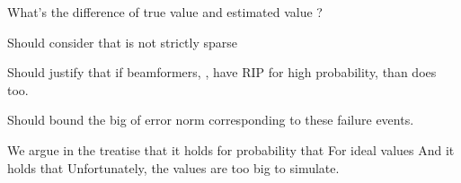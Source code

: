 {
\I What's the difference of true value  and estimated value ?

\I Should consider that  is not strictly sparse

\I Should justify that if beamformers, , have RIP for high probability, than  does too.

\I Should bound the big  of error norm corresponding to these failure events.
}
{
\I We argue in the treatise that it holds for probability  that
%
\I For ideal values
%
\I And it holds that
%
\I Unfortunately, the values are too big to simulate.
}



